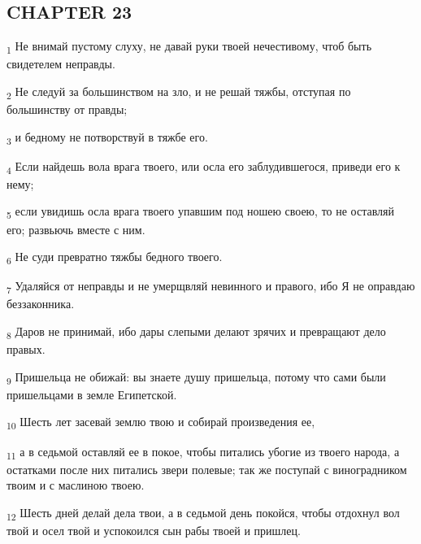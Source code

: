 \subsection{CHAPTER 23}
\begin{tcolorbox}
\textsubscript{1} Не внимай пустому слуху, не давай руки твоей нечестивому, чтоб быть свидетелем неправды.
\end{tcolorbox}
\begin{tcolorbox}
\textsubscript{2} Не следуй за большинством на зло, и не решай тяжбы, отступая по большинству от правды;
\end{tcolorbox}
\begin{tcolorbox}
\textsubscript{3} и бедному не потворствуй в тяжбе его.
\end{tcolorbox}
\begin{tcolorbox}
\textsubscript{4} Если найдешь вола врага твоего, или осла его заблудившегося, приведи его к нему;
\end{tcolorbox}
\begin{tcolorbox}
\textsubscript{5} если увидишь осла врага твоего упавшим под ношею своею, то не оставляй его; развьючь вместе с ним.
\end{tcolorbox}
\begin{tcolorbox}
\textsubscript{6} Не суди превратно тяжбы бедного твоего.
\end{tcolorbox}
\begin{tcolorbox}
\textsubscript{7} Удаляйся от неправды и не умерщвляй невинного и правого, ибо Я не оправдаю беззаконника.
\end{tcolorbox}
\begin{tcolorbox}
\textsubscript{8} Даров не принимай, ибо дары слепыми делают зрячих и превращают дело правых.
\end{tcolorbox}
\begin{tcolorbox}
\textsubscript{9} Пришельца не обижай: вы знаете душу пришельца, потому что сами были пришельцами в земле Египетской.
\end{tcolorbox}
\begin{tcolorbox}
\textsubscript{10} Шесть лет засевай землю твою и собирай произведения ее,
\end{tcolorbox}
\begin{tcolorbox}
\textsubscript{11} а в седьмой оставляй ее в покое, чтобы питались убогие из твоего народа, а остатками после них питались звери полевые; так же поступай с виноградником твоим и с маслиною твоею.
\end{tcolorbox}
\begin{tcolorbox}
\textsubscript{12} Шесть дней делай дела твои, а в седьмой день покойся, чтобы отдохнул вол твой и осел твой и успокоился сын рабы твоей и пришлец.
\end{tcolorbox}
